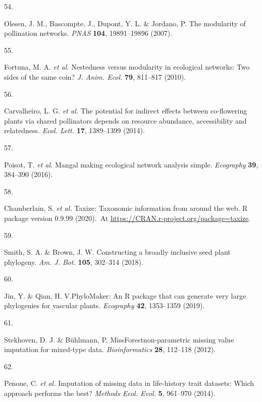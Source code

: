\documentclass[
  12pt,
  a4paper,
]{article}
\newlength{\cslhangindent}
\newlength{\csllabelwidth}
\newlength{\cslentryspacingunit} %
\newenvironment{CSLReferences}[2] %
 {%
  \setlength{\parindent}{0pt}
  \ifodd #1
  \let\oldpar\par
  \def\par{\hangindent=\cslhangindent\oldpar}
  \fi
  \setlength{\parskip}{#2\cslentryspacingunit}
 }%
 {}
\newcommand{\CSLLeftMargin}[1]{\parbox[t]{\csllabelwidth}{#1}}
\newcommand{\CSLRightInline}[1]{\parbox[t]{\linewidth - \csllabelwidth}{#1}\break}
\begin{document}
\begin{CSLReferences}{0}{0}
\leavevmode{}%
\CSLLeftMargin{54. }
\CSLRightInline{Olesen, J. M., Bascompte, J., Dupont, Y. L. \& Jordano, P. The modularity of pollination networks. \emph{PNAS} \textbf{104}, 19891--19896 (2007).}

\leavevmode{}%
\CSLLeftMargin{55. }
\CSLRightInline{Fortuna, M. A. \emph{et al.} Nestedness versus modularity in ecological networks: Two sides of the same coin? \emph{J. Anim. Ecol.} \textbf{79}, 811--817 (2010).}

\leavevmode{}%
\CSLLeftMargin{56. }
\CSLRightInline{Carvalheiro, L. G. \emph{et al.} The potential for indirect effects between co-flowering plants via shared pollinators depends on resource abundance, accessibility and relatedness. \emph{Ecol. Lett.} \textbf{17}, 1389--1399 (2014).}

\leavevmode{}%
\CSLLeftMargin{57. }
\CSLRightInline{Poisot, T. \emph{et al.} Mangal \textendash{} making ecological network analysis simple. \emph{Ecography} \textbf{39}, 384--390 (2016).}

\leavevmode{}%
\CSLLeftMargin{58. }
\CSLRightInline{Chamberlain, S. \emph{et al.} Taxize: {Taxonomic} information from around the web. R package version 0.9.99 (2020).~At \href{https://CRAN.R-project.org/package=taxize}{https://CRAN.r-project.org/package=taxize}.}

\leavevmode{}%
\CSLLeftMargin{59. }
\CSLRightInline{Smith, S. A. \& Brown, J. W. Constructing a broadly inclusive seed plant phylogeny. \emph{Am. J. Bot.} \textbf{105}, 302--314 (2018).}

\leavevmode{}%
\CSLLeftMargin{60. }
\CSLRightInline{Jin, Y. \& Qian, H. V.{PhyloMaker}: An {R} package that can generate very large phylogenies for vascular plants. \emph{Ecography} \textbf{42}, 1353--1359 (2019).}

\leavevmode{}%
\CSLLeftMargin{61. }
\CSLRightInline{Stekhoven, D. J. \& Bühlmann, P. {MissForest}\textemdash non-parametric missing value imputation for mixed-type data. \emph{Bioinformatics} \textbf{28}, 112--118 (2012).}

\leavevmode{}%
\CSLLeftMargin{62. }
\CSLRightInline{Penone, C. \emph{et al.} Imputation of missing data in life-history trait datasets: Which approach performs the best? \emph{Methods Ecol. Evol.} \textbf{5}, 961--970 (2014).}


\end{CSLReferences}
\end{document}

